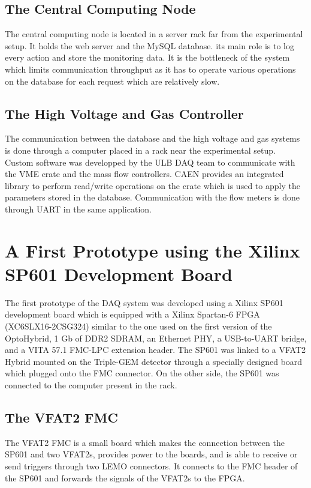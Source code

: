     \subsection{The Central Computing Node}

      The central computing node is located in a server rack far from the experimental setup. It holds the web server and the MySQL database. its main role is to log every action and store the monitoring data. It is the bottleneck of the system which limits communication throughput as it has to operate various operations on the database for each request which are relatively slow.

    \subsection{The High Voltage and Gas Controller}

      The communication between the database and the high voltage and gas systems is done through a computer placed in a rack near the experimental setup. Custom software was developped by the ULB DAQ team to communicate with the VME crate and the mass flow controllers. CAEN provides an integrated library to perform read/write operations on the crate which is used to apply the parameters stored in the database. Communication with the flow meters is done through UART in the same application.

  \section{A First Prototype using the Xilinx SP601 Development Board}

    The first prototype of the DAQ system was developed using a Xilinx SP601 development board which is equipped with a Xilinx Spartan-6 FPGA (XC6SLX16-2CSG324) similar to the one used on the first version of the OptoHybrid, 1 Gb of DDR2 SDRAM, an Ethernet PHY, a USB-to-UART bridge, and a VITA 57.1 FMC-LPC extension header. The SP601 was linked to a VFAT2 Hybrid mounted on the Triple-GEM detector through a specially designed board which plugged onto the FMC connector. On the other side, the SP601 was connected to the computer present in the rack.

    \subsection{The VFAT2 FMC}

      The VFAT2 FMC is a small board which makes the connection between the SP601 and two VFAT2s, provides power to the boards, and is able to receive or send triggers through two LEMO connectors. It connects to the FMC header of the SP601 and forwards the signals of the VFAT2s to the FPGA.


